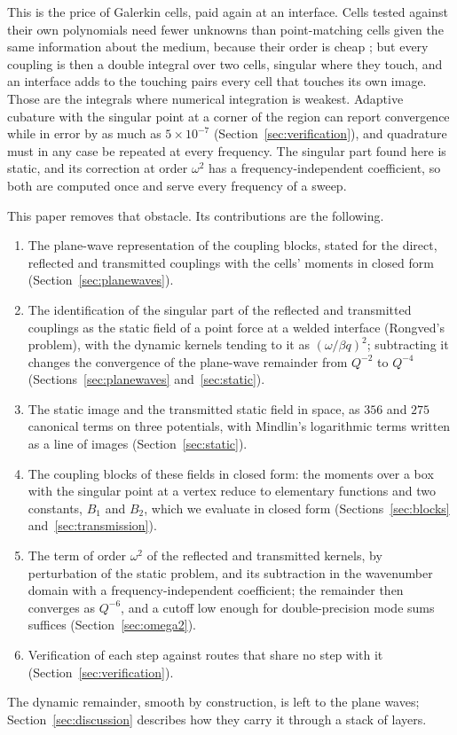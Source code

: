 \documentclass[11pt,a4paper]{article}
\begin{document}
This is the price of Galerkin cells, paid again at an interface. Cells tested against their own polynomials
need fewer unknowns than point-matching cells given the same information about the medium, because their
order is cheap \citep{NestorError2026}; but every coupling is then a double integral over two cells, singular where they
touch, and an interface adds to the touching pairs every cell that touches its own image. Those are the
integrals where numerical integration is weakest. Adaptive cubature with the singular point at a corner of
the region can report convergence while in error by as much as $5\times10^{-7}$
(Section~\ref{sec:verification}), and quadrature must in any case be repeated at every frequency. The
singular part found here is static, and its correction at order $\omega^2$ has a frequency-independent
coefficient, so both are computed once and serve every frequency of a sweep.

This paper removes that obstacle. Its contributions are the following.
\begin{enumerate}
  \item The plane-wave representation of the coupling blocks, stated for the direct, reflected and
  transmitted couplings with the cells' moments in closed form (Section~\ref{sec:planewaves}).
  \item The identification of the singular part of the reflected and transmitted couplings as the static
  field of a point force at a welded interface (Rongved's problem), with the dynamic kernels tending to it
  as $(\omega/\beta q)^2$; subtracting it changes the convergence of the plane-wave remainder from $Q^{-2}$ to
  $Q^{-4}$ (Sections~\ref{sec:planewaves} and~\ref{sec:static}).
  \item The static image and the transmitted static field in space, as $356$ and $275$ canonical terms on
  three potentials, with Mindlin's logarithmic terms written as a line of images (Section~\ref{sec:static}).
  \item The coupling blocks of these fields in closed form: the moments over a box with the singular point at a
  vertex reduce to elementary functions and two constants, $B_1$ and $B_2$, which we evaluate in closed
  form (Sections~\ref{sec:blocks} and~\ref{sec:transmission}).
  \item The term of order $\omega^2$ of the reflected and transmitted kernels, by perturbation of the static
  problem, and its subtraction in the wavenumber domain with a frequency-independent coefficient; the
  remainder then converges as $Q^{-6}$, and a cutoff low enough for double-precision mode sums suffices
  (Section~\ref{sec:omega2}).
  \item Verification of each step against routes that share no step with it (Section~\ref{sec:verification}).
\end{enumerate}
The dynamic remainder, smooth by construction, is left to the plane waves; Section~\ref{sec:discussion}
describes how they carry it through a stack of layers.
\end{document}

